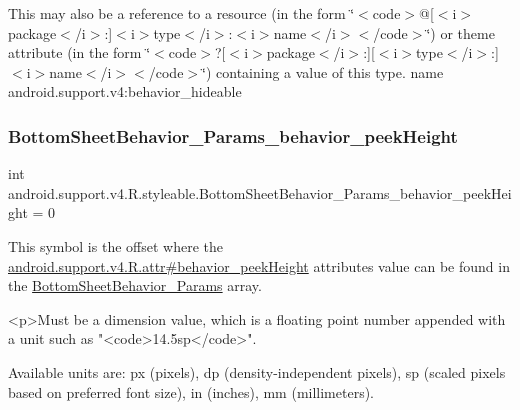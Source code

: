 This may also be a reference to a resource (in the form \char`\"{}$<$code$>$@\mbox{[}$<$i$>$package$<$/i$>$\+:\mbox{]}$<$i$>$type$<$/i$>$\+:$<$i$>$name$<$/i$>$$<$/code$>$\char`\"{}) or theme attribute (in the form \char`\"{}$<$code$>$?\mbox{[}$<$i$>$package$<$/i$>$\+:\mbox{]}\mbox{[}$<$i$>$type$<$/i$>$\+:\mbox{]}$<$i$>$name$<$/i$>$$<$/code$>$\char`\"{}) containing a value of this type.  name android.\+support.\+v4\+:behavior\+\_\+hideable \mbox{\label{classandroid_1_1support_1_1v4_1_1R_1_1styleable_a263c5bb11a9f89389416857ef1b21c5d}} 
\subsubsection{\texorpdfstring{Bottom\+Sheet\+Behavior\+\_\+\+Params\+\_\+behavior\+\_\+peek\+Height}{BottomSheetBehavior\_Params\_behavior\_peekHeight}}
{\footnotesize\ttfamily int android.\+support.\+v4.\+R.\+styleable.\+Bottom\+Sheet\+Behavior\+\_\+\+Params\+\_\+behavior\+\_\+peek\+Height = 0\hspace{0.3cm}{\ttfamily [static]}}

This symbol is the offset where the \hyperlink{classandroid_1_1support_1_1v4_1_1R_1_1attr_a410f0e475e0b8e5e57b221d907504857}{android.\+support.\+v4.\+R.\+attr\#behavior\+\_\+peek\+Height} attribute\textquotesingle{}s value can be found in the \hyperlink{classandroid_1_1support_1_1v4_1_1R_1_1styleable_aeef0bb6121e7d6065d53100656871173}{Bottom\+Sheet\+Behavior\+\_\+\+Params} array.

\begin{DoxyVerb}      <p>Must be a dimension value, which is a floating point number appended with a unit such as "<code>14.5sp</code>".
\end{DoxyVerb}
 Available units are\+: px (pixels), dp (density-\/independent pixels), sp (scaled pixels based on preferred font size), in (inches), mm (millimeters). 

